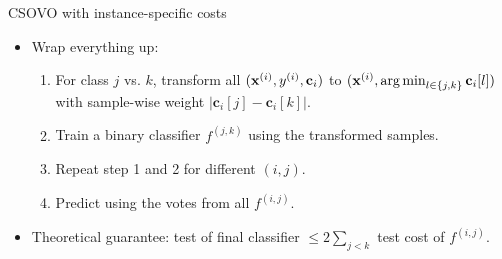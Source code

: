 \documentclass[11pt,compress,t,notes=noshow, xcolor=table]{beamer}
\newcommand{\cv}{\mathbf{c}}    %
\begin{document}
\begin{vbframe}{CSOVO with instance-specific costs}
    \footnotesize
    \begin{itemize}

    \item Wrap everything up:
    \begin{enumerate}
        \footnotesize
        \item For class $j$ vs. $k$, transform all $(\xi, \yi, \cv_i)$ to $(\xi, \argmin_{l \in \{j, k\}} \cv_i[l])$ with sample-wise weight $|\cv_i[j] - \cv_i[k]|$.
        \vspace{5pt}
        
        \item Train a binary classifier $f^{(j, k)}$ using the transformed samples.
        \vspace{5pt}
        
        \item Repeat step 1 and 2 for different $(i, j)$.
        \vspace{5pt}
        
        \item Predict using the votes from all $f^{(i, j)}$.
    \end{enumerate}
    \vspace{5pt}

    \item Theoretical guarantee: test of final classifier $\leq 2\sum_{j < k}$ test cost of $f^{(i, j)}$. 
    \end{itemize}
\end{vbframe}
\end{document}
